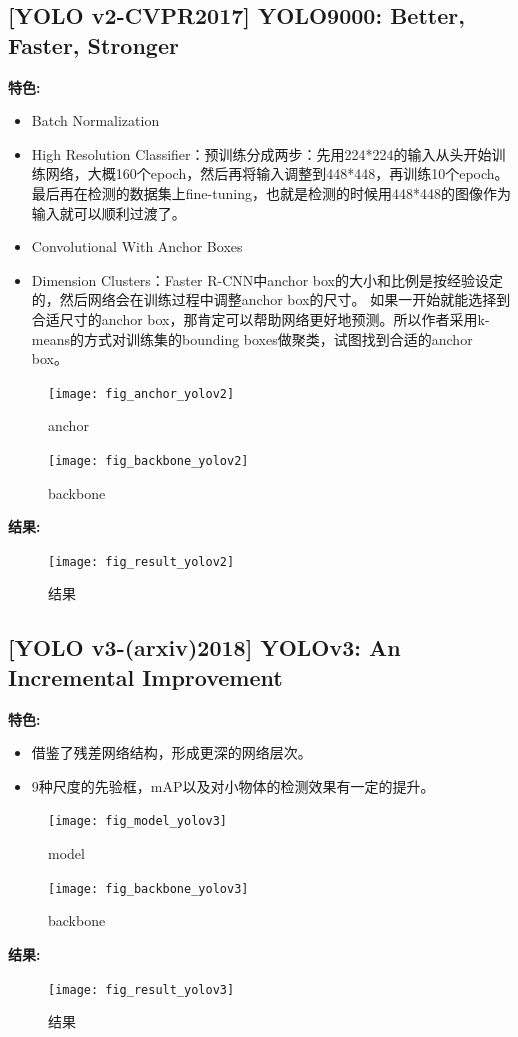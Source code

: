 \documentclass[a4paper, notitlepage]{article}
\begin{document}
\subsection{[YOLO v2-CVPR2017] YOLO9000: Better, Faster, Stronger}

\textbf{特色:}
\begin{itemize}
	\item Batch Normalization
	\item High Resolution Classifier：预训练分成两步：先用224*224的输入从头开始训练网络，大概160个epoch，然后再将输入调整到448*448，再训练10个epoch。最后再在检测的数据集上fine-tuning，也就是检测的时候用448*448的图像作为输入就可以顺利过渡了。
	\item Convolutional With Anchor Boxes 
	\item Dimension Clusters：Faster R-CNN中anchor box的大小和比例是按经验设定的，然后网络会在训练过程中调整anchor box的尺寸。
	如果一开始就能选择到合适尺寸的anchor box，那肯定可以帮助网络更好地预测。所以作者采用k-means的方式对训练集的bounding boxes做聚类，试图找到合适的anchor box。
\end{itemize}
\begin{figure}[H]
    \centering
    \texttt{[image: fig\_anchor\_yolov2]}
    \caption{anchor}
    \label{fig:example}
\end{figure}
\begin{figure}[H]
    \centering
    \texttt{[image: fig\_backbone\_yolov2]}
    \caption{backbone}
    \label{fig:example}
\end{figure}
\textbf{结果:}
\begin{figure}[H]
    \centering
    \texttt{[image: fig\_result\_yolov2]}
    \caption{结果}
    \label{fig:example}
\end{figure}


\subsection{[YOLO v3-(arxiv)2018] YOLOv3: An Incremental Improvement}

\textbf{特色:}
\begin{itemize}
	\item 借鉴了残差网络结构，形成更深的网络层次。
	\item 9种尺度的先验框，mAP以及对小物体的检测效果有一定的提升。
\end{itemize}
\begin{figure}[H]
    \centering
    \texttt{[image: fig\_model\_yolov3]}
    \caption{model}
    \label{fig:example}
\end{figure}
\begin{figure}[H]
    \centering
    \texttt{[image: fig\_backbone\_yolov3]}
    \caption{backbone}
    \label{fig:example}
\end{figure}
\textbf{结果:}
\begin{figure}[H]
    \centering
    \texttt{[image: fig\_result\_yolov3]}
    \caption{结果}
    \label{fig:example}
\end{figure}
\end{document}
